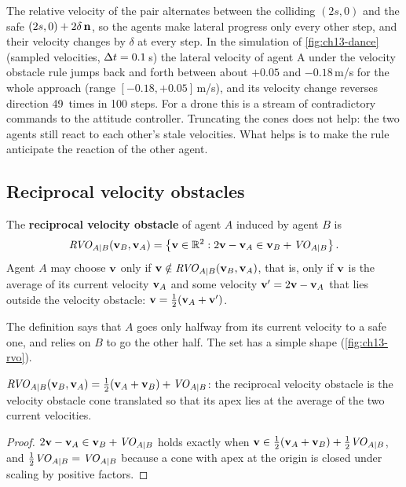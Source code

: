 The relative velocity of the pair alternates between the colliding
$(2s, 0)$ and the safe $(2s, 0) + 2\delta\,\mathbf{n}$, so the agents make
lateral progress only every other step, and their velocity changes by
$\delta$ at every step. In the simulation of \cref{fig:ch13-dance} (sampled
velocities, $\Delta t = 0.1$\,s) the lateral velocity of agent A under the
velocity obstacle rule jumps back and forth between about $+0.05$ and
$-0.18$\,m/s for the whole approach (range $[-0.18, +0.05]$\,m/s), and its
velocity change reverses direction 49~times in 100 steps. For a drone this is a stream of contradictory commands to the
attitude controller. Truncating the cones does not help: the two agents
still react to each other's stale velocities. What helps is to make the
rule anticipate the reaction of the other agent.

\subsection{Reciprocal velocity obstacles}
\label{sec:ch13-rvo}

\begin{definition}
\label{def:ch13-rvo}
The \textbf{reciprocal velocity obstacle}
of agent $A$ induced by agent $B$ is
\begin{equation}
  \mathit{RVO}_{A|B}(\mathbf{v}_B, \mathbf{v}_A) = \left\{ \mathbf{v} \in \mathbb{R}^2 : 2\mathbf{v} - \mathbf{v}_A \in \mathbf{v}_B + \mathit{VO}_{A|B} \right\}.
  \label{eq:ch13-rvo}
\end{equation}
Agent $A$ may choose $\mathbf{v}$ only if $\mathbf{v} \notin \mathit{RVO}_{A|B}(\mathbf{v}_B, \mathbf{v}_A)$,
that is, only if $\mathbf{v}$ is the average of its current velocity $\mathbf{v}_A$ and
some velocity $\mathbf{v}' = 2\mathbf{v} - \mathbf{v}_A$ that lies outside the velocity
obstacle: $\mathbf{v} = \tfrac12(\mathbf{v}_A + \mathbf{v}')$.
\end{definition}

The definition says that $A$ goes only halfway from its current velocity to
a safe one, and relies on $B$ to go the other half. The set has a simple
shape (\cref{fig:ch13-rvo}).

\begin{proposition}
\label{thm:ch13-rvo-apex}
$\mathit{RVO}_{A|B}(\mathbf{v}_B, \mathbf{v}_A) = \tfrac12(\mathbf{v}_A + \mathbf{v}_B) + \mathit{VO}_{A|B}$: the
reciprocal velocity obstacle is the velocity obstacle cone translated so
that its apex lies at the average of the two current velocities.
\end{proposition}
\begin{proof}
$2\mathbf{v} - \mathbf{v}_A \in \mathbf{v}_B + \mathit{VO}_{A|B}$ holds exactly when
$\mathbf{v} \in \tfrac12(\mathbf{v}_A + \mathbf{v}_B) + \tfrac12\mathit{VO}_{A|B}$, and
$\tfrac12\mathit{VO}_{A|B} = \mathit{VO}_{A|B}$ because a cone with apex at the origin is
closed under scaling by positive factors.
\end{proof}

